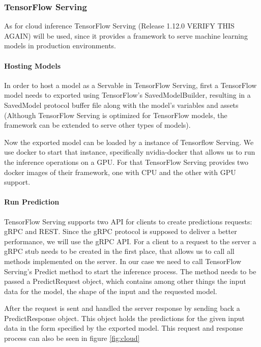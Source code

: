 \subsubsection{TensorFlow Serving}
\label{chap:TFServing}
As for cloud inference TensorFlow Serving (Release 1.12.0 VERIFY THIS AGAIN) will be used, since it provides a framework to serve machine learning models in production environments. 



\paragraph{Hosting Models}
In order to host a model as a Servable in TensorFlow Serving, first a TensorFlow model needs to exported using TensorFlow's SavedModelBuilder, resulting in a SavedModel protocol buffer file along with the model’s variables and assets (Although TensorFlow Serving is optimized for TensorFlow models, the framework can be extended to serve other types of models).

Now the exported model can be loaded by a instance of Tensorflow Serving.
We use docker to start that instance, specifically nvidia-docker that allows us to run the inference operations on a GPU. For that TensorFlow Serving provides two docker images of their framework, one with CPU and the other with GPU support.

\paragraph{Run Prediction}
TensorFlow Serving supports two API for clients to create predictions requests: gRPC and REST. Since the gRPC protocol is supposed to deliver a better performance, we will use the gRPC API.
For a client to a request to the server a gRPC stub needs to be created in the first place, that allows us to call all methods implemented on the server. In our case we need to call TensorFlow Serving's Predict method to start the inference process. The method needs to be passed a PredictRequest object, which contains among other things the input data for the model, the shape of the input and the requested model.%

After the request is sent and handled the server response by sending back a PredictResponse object. This object holds the predictions for the given input data in the form specified by the exported model.
This request and response process can also be seen in figure \ref{fig:cloud}


